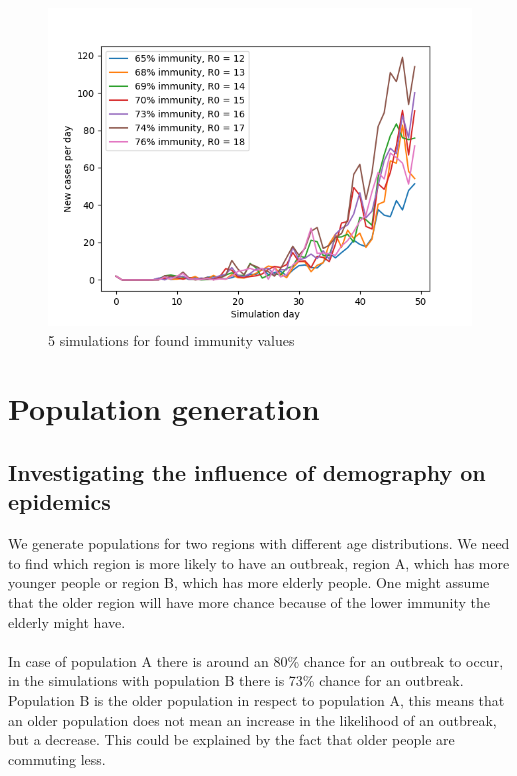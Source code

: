 \documentclass[runningheads]{llncs}
\begin{document}
\begin{figure}
	\includegraphics[width=\textwidth]{test_R0_final.png}
	\caption{5 simulations for found immunity values} 
\end{figure}

\newpage
\noindent
\section{Population generation}

\subsection{Investigating the influence of demography on epidemics}
We generate populations for two regions with different age distributions. We need to find which region is more likely to have an outbreak, region A, which has more younger people or region B, which has more elderly people. One might assume that the older region will have more chance because of the lower immunity the elderly might have.
\\
\\
\noindent
In case of population A there is around an 80\% chance for an outbreak to occur, in the simulations with population B there is 73\% chance for an outbreak. Population B is the older population in respect to population A, this means that an older population does not mean an increase in the likelihood of an outbreak, but a decrease. This could be explained by the fact that older people are commuting less.
\end{document}
